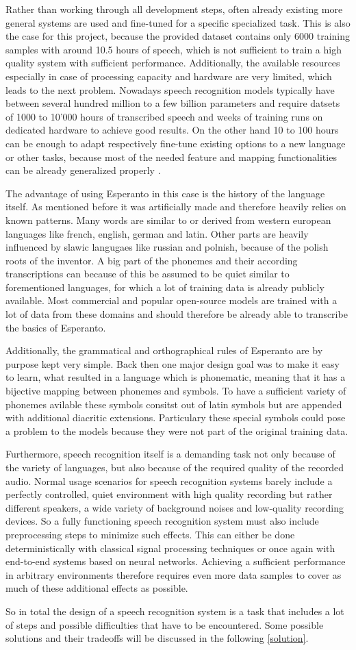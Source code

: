 Rather than working through all development steps, often already existing more general systems are used and fine-tuned for a specific specialized task.
This is also the case for this project, because the provided dataset contains only 6000 training samples with around 10.5 hours of speech, which is not sufficient to train a high quality system with sufficient performance.
Additionally, the available resources especially in case of processing capacity and hardware are very limited, which leads to the next problem. 
Nowadays speech recognition models typically have between several hundred million to a few billion parameters and require datsets of 1000 to 10'000 hours of transcribed speech and weeks of training runs on dedicated hardware to achieve good results.
On the other hand 10 to 100 hours can be enough to adapt respectively fine-tune existing options to a new language or other tasks, because most of the needed feature and mapping functionalities can be already generalized properly \cite{choudhary2026speech}.

The advantage of using Esperanto in this case is the history of the language itself.
As mentioned before it was artificially made and therefore heavily relies on known patterns.
Many words are similar to or derived from western european languages like french, english, german and latin.
Other parts are heavily influenced by slawic langugaes like russian and polnish, because of the polish roots of the inventor.
A big part of the phonemes and their according transcriptions can because of this be assumed to be quiet similar to forementioned languages, for which a lot of training data is already publicly available.
Most commercial and popular open-source models are trained with a lot of data from these domains and should therefore be already able to transcribe the basics of Esperanto. 

Additionally, the grammatical and orthographical rules of Esperanto are by purpose kept very simple.
Back then one major design goal was to make it easy to learn, what resulted in a language which is phonematic, meaning that it has a bijective mapping between phonemes and symbols.
To have a sufficient variety of phonemes avilable these symbols consitst out of latin symbols but are appended with additional diacritic extensions.
Particulary these special symbols could pose a problem to the models because they were not part of the original training data. 


Furthermore, speech recognition itself is a demanding task not only because of the variety of languages, but also because of the required quality of the recorded audio.
Normal usage scenarios for speech recognition systems barely include a perfectly controlled, quiet environment with high quality recording but rather different speakers, a wide variety of background noises and low-quality recording devices.
So a fully functioning speech recognition system must also include preprocessing steps to minimize such effects. 
This can either be done deterministically with classical signal processing techniques or once again with end-to-end systems based on neural networks.
Achieving a sufficient performance in arbitrary environments therefore requires even more data samples to cover as much of these additional effects as possible.

So in total the design of a speech recognition system is a task that includes a lot of steps and possible difficulties that have to be encountered.
Some possible solutions and their tradeoffs will be discussed in the following \autoref{solution}.